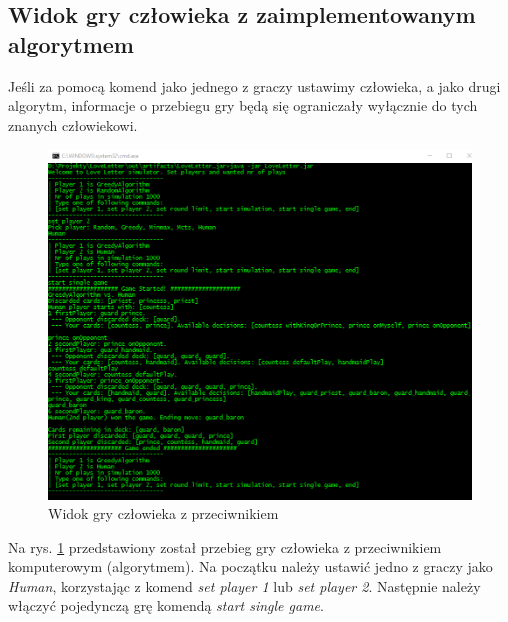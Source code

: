 \subsection*{Widok gry człowieka z zaimplementowanym algorytmem}
Jeśli za pomocą komend jako jednego z graczy ustawimy człowieka, a jako drugi algorytm, informacje o przebiegu gry będą się ograniczały wyłącznie do tych znanych człowiekowi.
\begin{figure}[H]
	\centering
	\includegraphics[width=\textwidth]{Resources/cli3.png}
	\caption{Widok gry człowieka z przeciwnikiem} 
	\label{fig:cli3}
\end{figure}

Na rys. \ref{fig:cli3} przedstawiony został przebieg gry człowieka z przeciwnikiem komputerowym (algorytmem). Na początku należy ustawić jedno z graczy jako \textit{Human}, korzystając z komend \textit{set player 1} lub \textit{set player 2}. Następnie należy włączyć pojedynczą grę komendą \textit{start single game}.



